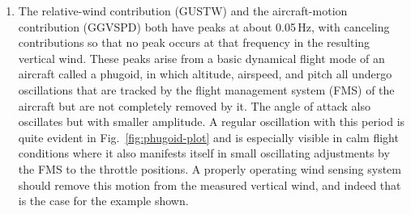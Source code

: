 \documentclass[12pt,twoside,english]{article}\usepackage[]{graphicx}\usepackage[]{color}
\newenvironment{knitrout}{}{} %
\let\OrgIndex\index
\renewcommand*{\index}[1]{\OrgIndex{#1}}
\begin{document}
\begin{enumerate}
\item The relative-wind contribution (GUSTW) and the aircraft-motion contribution (GGVSPD) both have peaks at about 0.05\,Hz, with canceling contributions so that no peak occurs at that frequency in the resulting vertical wind. These peaks arise from a basic dynamical flight mode of an aircraft called a phugoid, in which altitude, airspeed, and pitch all undergo oscillations that are tracked by the flight management system (FMS) of the aircraft  but are not completely removed by it. The angle of attack also oscillates but with smaller amplitude. A regular oscillation with this period is quite evident in Fig.~\ref{fig:phugoid-plot} and is especially visible in calm flight conditions where it also manifests itself in small oscillating adjustments by the FMS to the throttle positions. A properly operating wind sensing system should remove this motion from the measured vertical wind, and indeed that is the case for the example shown.

\begin{knitrout}\footnotesize
{}\color{fgcolor}\begin{figure}


\end{figure}
\end{knitrout}
\end{enumerate}
\end{document}
